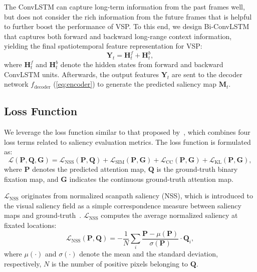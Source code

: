 \documentclass[review]{elsarticle}
\begin{document}
The ConvLSTM can capture long-term information from the past frames well, but does not consider the rich information from the future frames that is helpful to further boost the performance of VSP.
To this end, we design Bi-ConvLSTM that captures both forward and backward long-range context information, yielding the final spatiotemporal feature representation for VSP:
\begin{equation}
\label{eq:bi_convlstm}
\bm{Y}_{t} = \bm{H}_{t}^{f} + \bm{H}_{t}^{b},
\end{equation}
where $\bm{H}_{t}^{f}$ and $\bm{H}_{t}^{b}$ denote the hidden states from forward and backward ConvLSTM units.
Afterwards, the output features $\bm{Y}_{t}$ are sent to the decoder network $f_{\mathrm{decoder}}$ (\ref{eq:encoder}) to generate the predicted saliency map $\bm{M}_t$.

\subsection{Loss Function}
We leverage the loss function similar to that proposed by~\cite{huang2015salicon,lai2019video}, which combines four loss terms related to saliency evaluation metrics. The loss function is formulated as:
\begin{equation}
\label{eq:all_loss}
\mathcal{L}(\bm{P},\bm{Q},\bm{G}) = \mathcal{L}_{\mathrm{NSS}}(\bm{P},\bm{Q}) + \mathcal{L}_{\mathrm{SIM}}(\bm{P},\bm{G}) + \mathcal{L}_{\mathrm{CC}}(\bm{P},\bm{G}) + \mathcal{L}_{\mathrm{KL}}(\bm{P},\bm{G}),
\end{equation}
where  $\bm{P}$ denotes the predicted attention map, $\bm{Q}$ is the ground-truth binary fixation map, and $\bm{G}$ indicates the continuous ground-truth attention map.


$\mathcal{L}_{\mathrm{NSS}}$ originates from normalized scanpath saliency (NSS), which is introduced to the visual saliency field as a simple correspondence measure between saliency maps and ground-truth~\cite{peters2005components}.
$\mathcal{L}_{\mathrm{NSS}}$ computes the average normalized saliency at fixated locations:
\begin{equation}
\label{eq:nss}
\mathcal{L}_{\mathrm{NSS}}(\bm{P},\bm{Q}) = -\frac{1}{N} \sum\limits_{i} \frac{\bm{P} - \mu (\bm{P})}{\sigma (\bm{P})} \cdot \bm{Q}_{i},
\end{equation}
where $\mu (\cdot)$ and $\sigma (\cdot)$ denote the mean and the standard deviation, respectively, $N$ is the number of positive pixels belonging to $\bm{Q}$.
\end{document}
